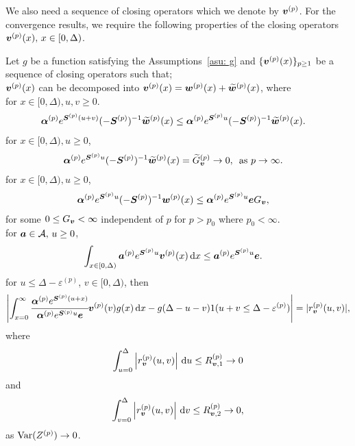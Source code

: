 We also need a sequence of closing operators which we denote by \({\boldsymbol v}^{(p)}\). For the convergence results, we require the following properties of the closing operators \({\boldsymbol v}^{(p)}(x),\, x \in[0,\Delta)\).
\begin{property}\label{properties: some props}
	Let \(g\) be a function satisfying the Assumptions~\ref{asu: g} and \(\{\boldsymbol v^{(p)}(x)\}_{p\geq 1}\) be a sequence of closing operators such that;\\
	\subproperty \label{properties: -3} \(\boldsymbol v^{(p)}(x)\) can be decomposed into \(\boldsymbol v^{(p)}(x)=\boldsymbol w^{(p)}(x) + \widetilde{\boldsymbol w}^{(p)}(x)\), where\\
	\subproperty \label{properties: -1} for \(x\in[0,\Delta),u,v\geq 0\). 
        \begin{align*}
        		\boldsymbol \alpha^{(p)} e^{\boldsymbol S^{(p)}(u+v)}(-\boldsymbol S^{(p)})^{-1} \widetilde{\boldsymbol w}^{(p)}(x) &\leq \boldsymbol \alpha^{(p)} e^{\boldsymbol S^{(p)}u}(-\boldsymbol S^{(p)})^{-1} \widetilde{\boldsymbol w}^{(p)}(x).
		\end{align*}
	\subproperty \label{properties: 0} for \(x\in[0,\Delta),u\geq 0\),
		\begin{align*}
			\boldsymbol \alpha^{(p)} e^{\boldsymbol S^{(p)}u}(-\boldsymbol S^{(p)})^{-1} \widetilde{\boldsymbol w}^{(p)}(x) &=\widetilde G_{\boldsymbol v}^{(p)} \to 0,\, \mbox{ as }p \to \infty.  
		\end{align*}
	\subproperty \label{properties: 1} for \(x\in[0,\Delta),u\geq 0\),  
        \begin{align*}
        		\boldsymbol \alpha^{(p)} e^{\boldsymbol S^{(p)}u}(-\boldsymbol S^{(p)})^{-1} \boldsymbol w^{(p)}(x) &\leq \boldsymbol \alpha^{(p)} e^{\boldsymbol S^{(p)}u} \boldsymbol e G_{\boldsymbol v},
	\end{align*}
	for some \(0\leq G_{\boldsymbol v}<\infty\) independent of \(p\) for \(p>p_0\) where \(p_0<\infty\). \\
	\subproperty \label{properties: -2} for \(\boldsymbol a \in\mathcal A,\,u\geq 0\),  
	\begin{align*}
			\int_{x\in[0,\Delta)}\boldsymbol a^{(p)} e^{\boldsymbol S^{(p)}u} {\boldsymbol v}^{(p)}(x) \, \mathrm{d} x&\leq \boldsymbol a^{(p)} e^{\boldsymbol S^{(p)}u} \boldsymbol e.
	\end{align*}
	\subproperty \label{properties: 2} for \(u\leq \Delta-\varepsilon^{(p)}\), \(v\in[0,\Delta)\), then
	\[\left|\int_{x=0}^\infty \cfrac{\boldsymbol \alpha^{(p)} e^{\boldsymbol{S}^{(p)}(u+x)} }{\boldsymbol \alpha^{(p)} e^{\boldsymbol{S}^{(p)}u} \boldsymbol e} {\boldsymbol v}^{(p)}(v)g(x)\, \mathrm{d} x -g(\Delta-u-v) 1(u+v\leq\Delta-\varepsilon^{(p)})\right| =  |r_{\boldsymbol v}^{(p)}(u,v)|,\]
	where 
	\[ \int_{u=0}^{\Delta}\left| r_{\boldsymbol v}^{(p)}(u,v)\right| \, \mathrm{d} u  \leq R_{{\boldsymbol v},1}^{(p)} \to 0\]
	and 
	\[ \int_{v=0}^{\Delta}\left| r_{\boldsymbol v}^{(p)}(u,v)\right| \, \mathrm{d} v  \leq R_{{\boldsymbol v},2}^{(p)} \to 0,\]
	as \(\mathrm{Var}(Z^{(p)})\to 0\). 
\end{property}

